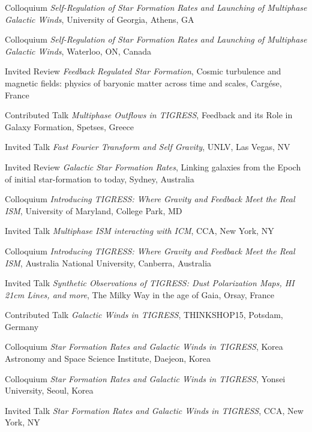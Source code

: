 \documentclass[12pt]{article}
\begin{document}
{Colloquium}
{\emph{Self-Regulation of Star Formation Rates and Launching of Multiphase Galactic Winds},
University of Georgia,
Athens, GA}

{Colloquium}
{\emph{Self-Regulation of Star Formation Rates and Launching of Multiphase Galactic Winds},
Waterloo,
ON, Canada}

{Invited Review}
{\emph{Feedback Regulated Star Formation},
Cosmic turbulence and magnetic fields: physics of baryonic matter across time and scales,
Carg\'ese, France}

{Contributed Talk}
{\emph{Multiphase Outflows in TIGRESS},
Feedback and its Role in Galaxy Formation,
Spetses, Greece}

{Invited Talk}
{\emph{Fast Fourier Transform and Self Gravity},
UNLV,
Las Vegas, NV}

{Invited Review}
{\emph{Galactic Star Formation Rates},
Linking galaxies from the Epoch of initial star-formation to today,
Sydney, Australia}

{Colloquium}
{\emph{Introducing TIGRESS: Where Gravity and Feedback Meet the Real ISM},
University of Maryland,
College Park, MD}

{Invited Talk}
{\emph{Multiphase ISM interacting with ICM},
CCA,
New York, NY}

{Colloquium}
{\emph{Introducing TIGRESS: Where Gravity and Feedback Meet the Real ISM},
Australia National University,
Canberra, Australia}

{Invited Talk}
{\emph{Synthetic Observations of TIGRESS: Dust Polarization Maps, HI 21cm Lines, and more},
The Milky Way in the age of Gaia,
Orsay, France}

{Contributed Talk}
{\emph{Galactic Winds in TIGRESS},
THINKSHOP15,
Potsdam, Germany}

{Colloquium}
{\emph{Star Formation Rates and Galactic Winds in TIGRESS},
Korea Astronomy and Space Science Institute,
Daejeon, Korea}

{Colloquium}
{\emph{Star Formation Rates and Galactic Winds in TIGRESS},
Yonsei University,
Seoul, Korea}

{Invited Talk}
{\emph{Star Formation Rates and Galactic Winds in TIGRESS},
CCA,
New York, NY}
\end{document}
